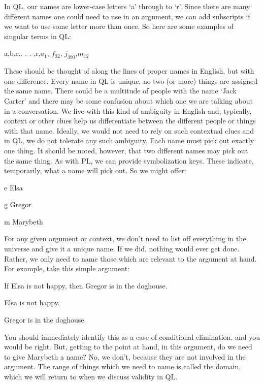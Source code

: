 In QL, our names are lower-case letters ‘a’ through to ‘r’. Since there are many different names one could need to use in an argument, we can add subscripts if we want to use some letter more than once. So here are some examples of singular terms in QL:
\begin{center}
a,b,c,. . . ,r,$a_1$, $f_{32}$, $j_{390}$,$m_{12}$
\end{center}
These should be thought of along the lines of proper names in English, but with one difference. Every name in QL is unique, no two (or more) things are assigned the same name. There could be a multitude of people with the name ‘Jack Carter' and there may be some confusion about which one we are talking about in a conversation. We live with this kind of ambiguity in English and, typically, context or other clues help us differentiate between the different people or things with that name. Ideally, we would not need to rely on such contextual clues and in QL, we do not tolerate any such ambiguity. Each name must pick out exactly one thing. It should be noted, however, that two different names may pick out the same thing. As with PL, we can provide symbolization keys. These indicate, temporarily, what a name will pick out. So we might offer:
\begin{ekey}
\item[e] Elsa
\item[g] Gregor
\item[m] Marybeth
\end{ekey}
For any given argument or context, we don't need to list off everything in the universe and give it a unique name. If we did, nothing would ever get done. Rather, we only need to name those which are relevant to the argument at hand. For example, take this simple argument:
\begin{earg}
\item[]If Elsa is not happy, then Gregor is in the doghouse. 
\item[]Elsa is not happy. 
\item[\therefore] Gregor is in the doghouse.
\end{earg}
You should immediately identify this as a case of conditional elimination, and you would be right. But, getting to the point at hand, in this argument, do we need to give Marybeth a name? No, we don't, because they are not involved in the argument. The range of things which we need to name is called the \gls{domain}, which we will return to when we discuss validity in QL.

